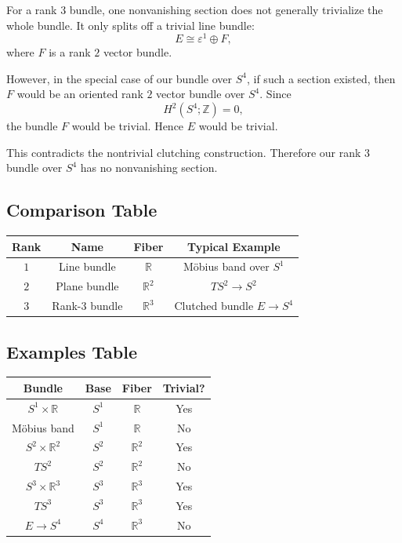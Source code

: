 \documentclass[12pt,a4paper]{article}
\theoremstyle{notespace}
\begin{document}
For a rank \(3\) bundle, one nonvanishing section does not generally trivialize the whole bundle. It only splits off a trivial line bundle:
\[
E\cong \varepsilon^1\oplus F,
\]
where \(F\) is a rank \(2\) vector bundle.

However, in the special case of our bundle over \(S^4\), if such a section existed, then \(F\) would be an oriented rank \(2\) vector bundle over \(S^4\). Since
\[
H^2(S^4;\mathbb Z)=0,
\]
the bundle \(F\) would be trivial. Hence \(E\) would be trivial.

This contradicts the nontrivial clutching construction. Therefore our rank \(3\) bundle over \(S^4\) has no nonvanishing section.

\subsection{Comparison Table}

\begin{center}
	\renewcommand{\arraystretch}{1.35}
	\begin{tabular}{c|c|c|c}
		\hline
		\textbf{Rank} & \textbf{Name} & \textbf{Fiber} & \textbf{Typical Example} \\
		\hline
		\(1\) & Line bundle & \(\mathbb R\) & Möbius band over \(S^1\) \\
		\(2\) & Plane bundle & \(\mathbb R^2\) & \(TS^2\to S^2\) \\
		\(3\) & Rank-\(3\) bundle & \(\mathbb R^3\) & Clutched bundle \(E\to S^4\) \\
		\hline
	\end{tabular}
\end{center}

\subsection{Examples Table}

\begin{center}
	\renewcommand{\arraystretch}{1.35}
	\begin{tabular}{c|c|c|c}
		\hline
		\textbf{Bundle} & \textbf{Base} & \textbf{Fiber} & \textbf{Trivial?} \\
		\hline
		\(S^1\times \mathbb R\) & \(S^1\) & \(\mathbb R\) & Yes \\
		Möbius band & \(S^1\) & \(\mathbb R\) & No \\
		\(S^2\times \mathbb R^2\) & \(S^2\) & \(\mathbb R^2\) & Yes \\
		\(TS^2\) & \(S^2\) & \(\mathbb R^2\) & No \\
		\(S^3\times \mathbb R^3\) & \(S^3\) & \(\mathbb R^3\) & Yes \\
		\(TS^3\) & \(S^3\) & \(\mathbb R^3\) & Yes \\
		\(E\to S^4\) & \(S^4\) & \(\mathbb R^3\) & No \\
		\hline
	\end{tabular}
\end{center}
\end{document}
